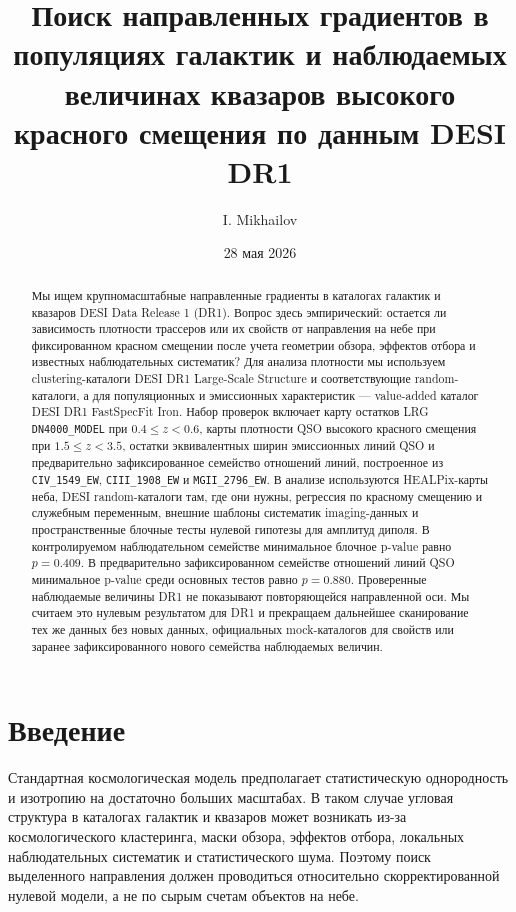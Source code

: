 \documentclass[11pt]{article}
\title{Поиск направленных градиентов в популяциях галактик и наблюдаемых величинах квазаров высокого красного смещения по данным DESI DR1}
\author{I. Mikhailov}
\affil{Независимый исследователь, Москва, Россия}
\date{28 мая 2026}
\begin{document}
\maketitle

\begin{abstract}
Мы ищем крупномасштабные направленные градиенты в каталогах галактик и квазаров DESI Data Release 1 (DR1). Вопрос здесь эмпирический: остается ли зависимость плотности трассеров или их свойств от направления на небе при фиксированном красном смещении после учета геометрии обзора, эффектов отбора и известных наблюдательных систематик? Для анализа плотности мы используем clustering-каталоги DESI DR1 Large-Scale Structure и соответствующие random-каталоги, а для популяционных и эмиссионных характеристик — value-added каталог DESI DR1 FastSpecFit Iron. Набор проверок включает карту остатков LRG \texttt{DN4000\_MODEL} при $0.4 \le z < 0.6$, карты плотности QSO высокого красного смещения при $1.5 \le z < 3.5$, остатки эквивалентных ширин эмиссионных линий QSO и предварительно зафиксированное семейство отношений линий, построенное из \texttt{CIV\_1549\_EW}, \texttt{CIII\_1908\_EW} и \texttt{MGII\_2796\_EW}. В анализе используются HEALPix-карты неба, DESI random-каталоги там, где они нужны, регрессия по красному смещению и служебным переменным, внешние шаблоны систематик imaging-данных и пространственные блочные тесты нулевой гипотезы для амплитуд диполя. В контролируемом наблюдательном семействе минимальное блочное p-value равно $p=0.409$. В предварительно зафиксированном семействе отношений линий QSO минимальное p-value среди основных тестов равно $p=0.880$. Проверенные наблюдаемые величины DR1 не показывают повторяющейся направленной оси. Мы считаем это нулевым результатом для DR1 и прекращаем дальнейшее сканирование тех же данных без новых данных, официальных mock-каталогов для свойств или заранее зафиксированного нового семейства наблюдаемых величин.
\end{abstract}

\section{Введение}

Стандартная космологическая модель предполагает статистическую однородность и изотропию на достаточно больших масштабах. В таком случае угловая структура в каталогах галактик и квазаров может возникать из-за космологического кластеринга, маски обзора, эффектов отбора, локальных наблюдательных систематик и статистического шума. Поэтому поиск выделенного направления должен проводиться относительно скорректированной нулевой модели, а не по сырым счетам объектов на небе.
\end{document}

